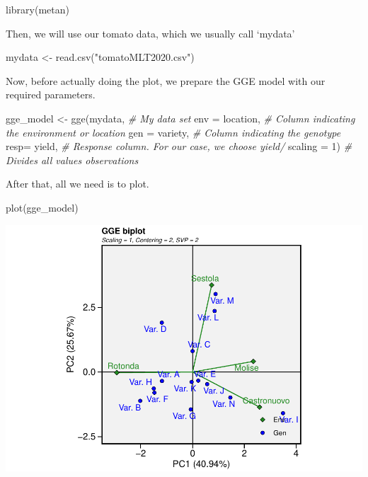 \documentclass[
]{book}
\newenvironment{Shaded}{\begin{snugshade}}{\end{snugshade}}
\newcommand{\AttributeTok}[1]{\textcolor[rgb]{0.77,0.63,0.00}{#1}}
\newcommand{\CommentTok}[1]{\textcolor[rgb]{0.56,0.35,0.01}{\textit{#1}}}
\newcommand{\DecValTok}[1]{\textcolor[rgb]{0.00,0.00,0.81}{#1}}
\newcommand{\FunctionTok}[1]{\textcolor[rgb]{0.00,0.00,0.00}{#1}}
\newcommand{\NormalTok}[1]{#1}
\newcommand{\OtherTok}[1]{\textcolor[rgb]{0.56,0.35,0.01}{#1}}
\newcommand{\StringTok}[1]{\textcolor[rgb]{0.31,0.60,0.02}{#1}}
\begin{document}
\begin{Shaded}
\begin{Highlighting}[]
\FunctionTok{library}\NormalTok{(metan)}
\end{Highlighting}
\end{Shaded}

Then, we will use our tomato data, which we usually call `mydata'

\begin{Shaded}
\begin{Highlighting}[]
\NormalTok{mydata }\OtherTok{\textless{}{-}} \FunctionTok{read.csv}\NormalTok{(}\StringTok{"tomatoMLT2020.csv"}\NormalTok{)}
\end{Highlighting}
\end{Shaded}

Now, before actually doing the plot, we prepare the GGE model with our required parameters.

\begin{Shaded}
\begin{Highlighting}[]
\NormalTok{gge\_model }\OtherTok{\textless{}{-}}  \FunctionTok{gge}\NormalTok{(mydata,             }\CommentTok{\# My data set }
                  \AttributeTok{env =}\NormalTok{ location,     }\CommentTok{\# Column indicating the environment or location}
                  \AttributeTok{gen =}\NormalTok{ variety,      }\CommentTok{\# Column indicating the genotype}
                  \AttributeTok{resp=}\NormalTok{ yield,        }\CommentTok{\# Response column. For our case, we choose yield/}
                  \AttributeTok{scaling =} \DecValTok{1}\NormalTok{)        }\CommentTok{\# Divides all values observations}
\end{Highlighting}
\end{Shaded}

After that, all we need is to plot.

\begin{Shaded}
\begin{Highlighting}[]
\FunctionTok{plot}\NormalTok{(gge\_model)}
\end{Highlighting}
\end{Shaded}

\includegraphics{PPB-Toolkit-for-R-and-R-Studio_files/figure-latex/unnamed-chunk-126-1.pdf}
\end{document}
